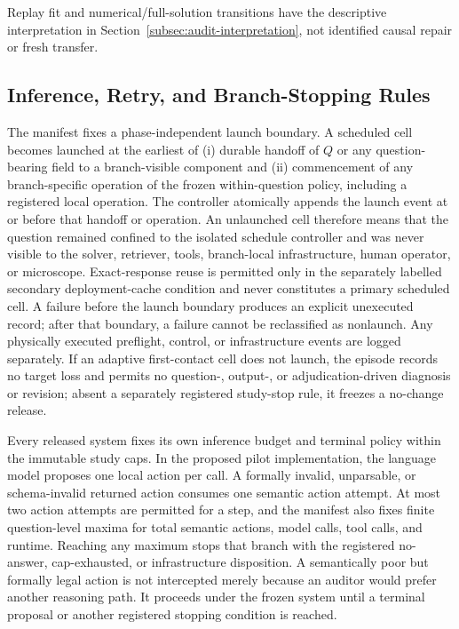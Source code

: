 \documentclass[10pt]{article} %
\providecommand{\1}{\mathbf{1}}  %
\theoremstyle{remark}
\theoremstyle{definition}
\begin{document}
Replay fit and numerical/full-solution transitions have the descriptive
interpretation in Section~\ref{subsec:audit-interpretation}, not identified
causal repair or fresh transfer.

\subsection{Inference, Retry, and Branch-Stopping Rules}

\label{subsec:pilot-retry-policy}

The manifest fixes a phase-independent launch boundary. A scheduled cell becomes launched at the earliest of (i) durable handoff of $Q$ or any question-bearing field to a branch-visible component and (ii) commencement of any branch-specific operation of the frozen within-question policy, including a registered local operation. The controller atomically appends the launch event at or before that handoff or operation. An unlaunched cell therefore means that the question remained confined to the isolated schedule controller and was never visible to the solver, retriever, tools, branch-local infrastructure, human operator, or microscope. Exact-response reuse is permitted only in the separately labelled secondary deployment-cache condition and never constitutes a primary scheduled cell. A failure before the launch boundary produces an explicit unexecuted record; after that boundary, a failure cannot be reclassified as nonlaunch. Any physically executed preflight, control, or infrastructure events are logged separately. If an adaptive first-contact cell does not launch, the episode records no target loss and permits no question-, output-, or adjudication-driven diagnosis or revision; absent a separately registered study-stop rule, it freezes a no-change release.

Every released system fixes its own inference budget and terminal policy within the immutable study caps. In the proposed pilot implementation, the language model proposes one local action per call. A formally invalid, unparsable, or schema-invalid returned action consumes one semantic action attempt. At most two action attempts are permitted for a step, and the manifest also fixes finite question-level maxima for total semantic actions, model calls, tool calls, and runtime. Reaching any maximum stops that branch with the registered no-answer, cap-exhausted, or infrastructure disposition. A semantically poor but formally legal action is not intercepted merely because an auditor would prefer another reasoning path. It proceeds under the frozen system until a terminal proposal or another registered stopping condition is reached.
\end{document}
